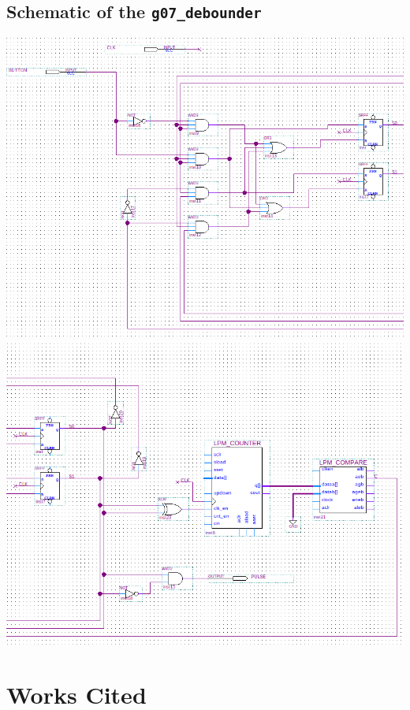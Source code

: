 \documentclass[12pt]{report}
\begin{document}
\begin{appendices}
	\chapter{Schematic of the \texttt{g07\_debounder}}
	\label{app:debounder}
	\includegraphics[scale=0.4,angle=0]{debounder1}\\
	\includegraphics[scale=0.37,angle=0]{debounder2}
\end{appendices}
\part{Works Cited}


\end{document}
